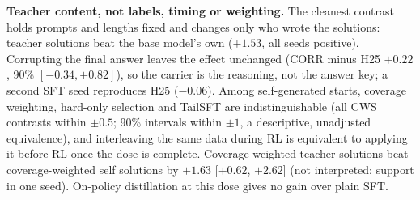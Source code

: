 \documentclass{article}
\theoremstyle{plain}
\begin{document}
\begin{table}[t]
\caption{Registered warm-start verdicts (1.5B, 1,024 tokens, three RL seeds, RL steps 1--150 where within the
reference's range). Gap: pass@16 at matched pass@1 (points, 95\% interval). Against Dr.\ GRPO unless stated.}
\label{tab:starts}
\centering\small
{}
\end{table}

\textbf{Teacher content, not labels, timing or weighting.} The cleanest contrast holds prompts and lengths fixed and
changes only who wrote the solutions: teacher solutions beat the base model's own ($+1.53$, all seeds positive).
Corrupting the final answer leaves the effect unchanged (CORR minus H25 $+0.22$, 90\% $[-0.34,+0.82]$), so the carrier
is the reasoning, not the answer key; a second SFT seed reproduces H25 ($-0.06$). Among self-generated starts, coverage
weighting, hard-only selection and TailSFT are indistinguishable (all CWS contrasts within $\pm0.5$; 90\% intervals
within $\pm1$, a descriptive, unadjusted equivalence), and interleaving the same data during RL is equivalent to
applying it before RL once the dose is complete. Coverage-weighted teacher solutions beat coverage-weighted self
solutions by $+1.63$ [$+0.62$, $+2.62$] (not interpreted: support in one seed). On-policy distillation at this dose
gives no gain over plain SFT.
\end{document}
